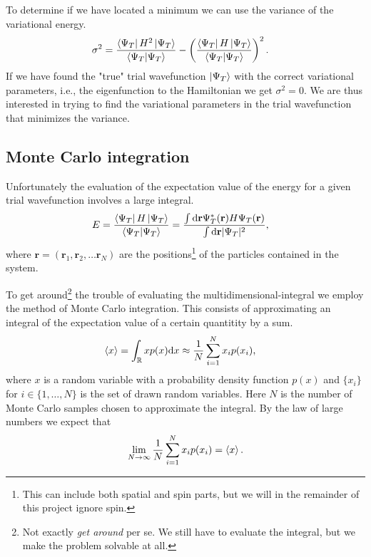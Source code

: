 \documentclass[
    a4paper, aps, twocolumn, floatfix, superscriptaddress,
    nofootinbib]{revtex4-1}
\newcommand{\vf}{\mathbf}
\newcommand{\1}{\mathds{1}}
\newcommand{\para}[1]{\left(#1\right)}
\begin{document}
    To determine if we have located a minimum we can use the variance of the
    variational energy.
    \begin{align}
        \sigma^2
        &=
        \frac{
            \bra{\Psi_T}H^2\ket{\Psi_T}
        }{
            \bra{\Psi_T}\ket{\Psi_T}
        }
        - \para{
            \frac{
                \bra{\Psi_T}H\ket{\Psi_T}
            }{
                \bra{\Psi_T}\ket{\Psi_T}
            }
        }^2.
    \end{align}
    If we have found the "true" trial wavefunction $\ket{\Psi_T}$ with the
    correct variational parameters, i.e., the eigenfunction to the Hamiltonian
    we get $\sigma^2 = 0$. We are thus interested in trying to find the
    variational parameters in the trial wavefunction that minimizes the
    variance.

    \subsection{Monte Carlo integration}
        Unfortunately the evaluation of the expectation value of the energy for
        a given trial wavefunction involves a large integral.
        \begin{align}
            E
            &= \frac{\bra{\Psi_T}H\ket{\Psi_T}}{\bra{\Psi_T}\ket{\Psi_T}}
            =
            \frac{\int\dd\vf{r}\Psi_T^{*}(\vf{r})H\Psi_T(\vf{r})}
            {\int\dd\vf{r}|\Psi_T|^2},
        \end{align}
        where $\vf{r} = (\vf{r}_1, \vf{r}_2, \dots \vf{r}_N)$ are the
        positions\footnote{This can include both spatial and spin parts, but we
        will in the remainder of this project ignore spin.} of the particles
        contained in the system.

        To get around\footnote{Not exactly \emph{get around} per se. We still
        have to evaluate the integral, but we make the problem solvable at all.}
        the trouble of evaluating the multidimensional-integral we employ the
        method of Monte Carlo integration. This consists of approximating an
        integral of the expectation value of a certain quantitity by a sum.
        \begin{align}
            \expval{x}
            &=
            \int_{\mathbb{R}}xp(x)\dd x
            \approx
            \frac{1}{N}\sum_{i = 1}^N x_ip(x_i),
        \end{align}
        where $x$ is a random variable with a probability density function
        $p(x)$ and $\{x_i\}$ for $i \in \{1, \dots, N\}$ is the set of drawn
        random variables. Here $N$ is the number of Monte Carlo samples chosen
        to approximate the integral. By the law of large numbers we expect that
        \begin{align}
            \lim_{N \to \infty}\frac{1}{N}\sum_{i = 1}^N x_ip(x_i)
            = \expval{x}.
        \end{align}
\end{document}
